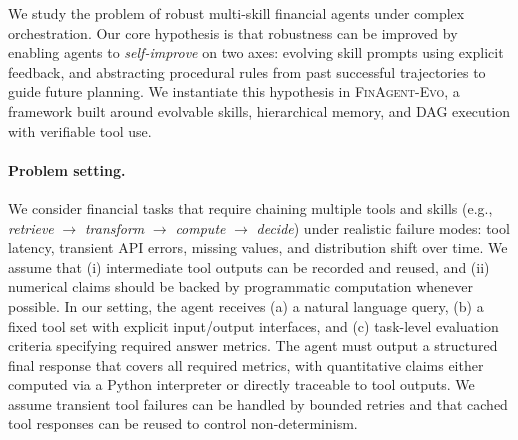 \documentclass{article}
\begin{document}
We study the problem of robust multi-skill financial agents under complex orchestration. Our core hypothesis is that robustness can be improved by enabling agents to \emph{self-improve} on two axes: evolving skill prompts using explicit feedback, and abstracting procedural rules from past successful trajectories to guide future planning. We instantiate this hypothesis in \textsc{FinAgent-Evo}, a framework built around evolvable skills, hierarchical memory, and DAG execution with verifiable tool use.

\paragraph{Problem setting.}
We consider financial tasks that require chaining multiple tools and skills (e.g., \emph{retrieve} $\rightarrow$ \emph{transform} $\rightarrow$ \emph{compute} $\rightarrow$ \emph{decide}) under realistic failure modes: tool latency, transient API errors, missing values, and distribution shift over time. We assume that (i) intermediate tool outputs can be recorded and reused, and (ii) numerical claims should be backed by programmatic computation whenever possible.
In our setting, the agent receives (a) a natural language query, (b) a fixed tool set with explicit input/output interfaces, and (c) task-level evaluation criteria specifying required answer metrics. The agent must output a structured final response that covers all required metrics, with quantitative claims either computed via a Python interpreter or directly traceable to tool outputs. We assume transient tool failures can be handled by bounded retries and that cached tool responses can be reused to control non-determinism.
\end{document}
